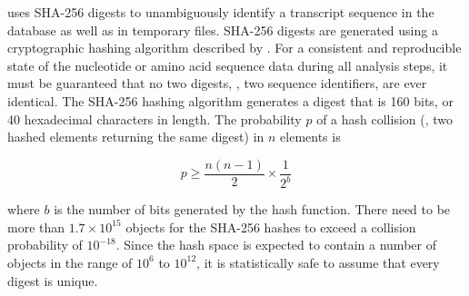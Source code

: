 \pname uses SHA-256 digests to unambiguously identify a transcript sequence in
the database as well as in temporary files. SHA-256 digests are generated using
a cryptographic hashing algorithm described by \citet{gallagher2008}. For a
consistent and reproducible state of the nucleotide or amino acid sequence data
during all analysis steps, it must be guaranteed that no two digests, \ie, two
sequence identifiers, are ever identical. The SHA-256 hashing algorithm
generates a digest that is 160 bits, or 40 hexadecimal characters in length. The
probability $p$ of a hash collision (\ie, two hashed elements returning the same
digest) in $n$ elements is

\begin{equation}
p \ge \frac{n (n-1)}{2} \times \frac{1}{2^b}
\label{eq:hashcollision}
\end{equation}

where $b$ is the number of bits generated by the hash function. There need to be
more than $1.7 \times 10^{15}$ objects for the SHA-256 hashes to exceed a collision
probability of $10^{-18}$. Since the hash space is expected to contain a number
of objects in the range of $10^6$ to $10^{12}$, it is statistically safe to
assume that every digest is unique. 

